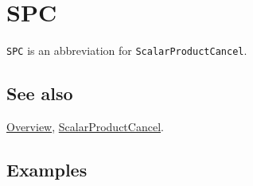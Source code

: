 \documentclass[../FeynCalcManual.tex]{subfiles}
\begin{document}
\hypertarget{spc}{%
\section{SPC}\label{spc}}

\texttt{SPC} is an abbreviation for \texttt{ScalarProductCancel}.

\subsection{See also}

\hyperlink{toc}{Overview},
\hyperlink{scalarproductcancel}{ScalarProductCancel}.

\subsection{Examples}
\end{document}
